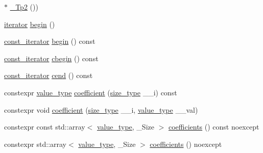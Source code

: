 \begin{DoxyCompactItemize}
\item 
$\ast$ \hyperlink{class____gnu__cxx_1_1__StaticPolynomial_a688f26b7c706701416fad299240aa856}{\+\_\+\+Tp2} ())
\item 
\hyperlink{class____gnu__cxx_1_1__StaticPolynomial_af042e6cdb307879fbfe357c13a843c7c}{iterator} \hyperlink{class____gnu__cxx_1_1__StaticPolynomial_a5ecf3a3e578ed364160dec4d980ad877}{begin} ()
\item 
\hyperlink{class____gnu__cxx_1_1__StaticPolynomial_a2e806a3a61788a2fad49adf67725ae7e}{const\+\_\+iterator} \hyperlink{class____gnu__cxx_1_1__StaticPolynomial_acb32e93b3c2f320dc51bbb3f918ae8b7}{begin} () const
\item 
\hyperlink{class____gnu__cxx_1_1__StaticPolynomial_a2e806a3a61788a2fad49adf67725ae7e}{const\+\_\+iterator} \hyperlink{class____gnu__cxx_1_1__StaticPolynomial_a5f4900e2888036e2edc649a95316b55c}{cbegin} () const
\item 
\hyperlink{class____gnu__cxx_1_1__StaticPolynomial_a2e806a3a61788a2fad49adf67725ae7e}{const\+\_\+iterator} \hyperlink{class____gnu__cxx_1_1__StaticPolynomial_aa3cf8c243eaa80347ae1ba02897344e9}{cend} () const
\item 
constexpr \hyperlink{class____gnu__cxx_1_1__StaticPolynomial_aad5f3d6d5876b6926b30724aeac649d6}{value\+\_\+type} \hyperlink{class____gnu__cxx_1_1__StaticPolynomial_a74535a3f8f586223097b30891bc1402b}{coefficient} (\hyperlink{class____gnu__cxx_1_1__StaticPolynomial_a0cc0aa4adab35686ef2474e07f511ff9}{size\+\_\+type} \+\_\+\+\_\+i) const
\item 
constexpr void \hyperlink{class____gnu__cxx_1_1__StaticPolynomial_a70fb64837727e4fea0dfe0bf5c8a4523}{coefficient} (\hyperlink{class____gnu__cxx_1_1__StaticPolynomial_a0cc0aa4adab35686ef2474e07f511ff9}{size\+\_\+type} \+\_\+\+\_\+i, \hyperlink{class____gnu__cxx_1_1__StaticPolynomial_aad5f3d6d5876b6926b30724aeac649d6}{value\+\_\+type} \+\_\+\+\_\+val)
\item 
constexpr const std\+::array$<$ \hyperlink{class____gnu__cxx_1_1__StaticPolynomial_aad5f3d6d5876b6926b30724aeac649d6}{value\+\_\+type}, \+\_\+\+Size $>$ \hyperlink{class____gnu__cxx_1_1__StaticPolynomial_a185a60f11031e84b6986efda1c804fd8}{coefficients} () const noexcept
\item 
constexpr std\+::array$<$ \hyperlink{class____gnu__cxx_1_1__StaticPolynomial_aad5f3d6d5876b6926b30724aeac649d6}{value\+\_\+type}, \+\_\+\+Size $>$ \hyperlink{class____gnu__cxx_1_1__StaticPolynomial_ab3c13a4b166e54bbb9c45fcfb16b2f00}{coefficients} () noexcept
\item 

\end{DoxyCompactItemize}
